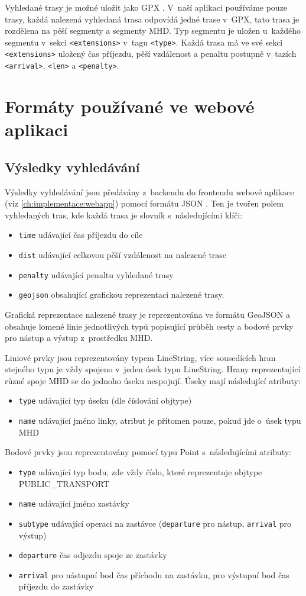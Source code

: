 Vyhledané trasy je možné uložit jako GPX \cite{GPX}. V~naší aplikaci používáme pouze trasy, každá
nalezená vyhledaná trasa odpovídá jedné trase v~GPX, tato trasa je rozdělena na
pěší segmenty a segmenty MHD. Typ segmentu je uložen u~každého segmentu v~sekci
{\tt <extensions>} v~tagu {\tt <type>}. Každá trasa má ve své sekci {\tt
<extensions>} uložený čas příjezdu, pěší vzdálenost a penaltu postupně v~tazích
{\tt <arrival>}, {\tt <len>} a {\tt <penalty>}.

\section{Formáty používané ve webové aplikaci}
\subsection{Výsledky vyhledávání}
Výsledky vyhledávání jsou předávány z~backendu do frontendu webové aplikace
(viz \ref{ch:implementace:webapp}) pomocí formátu JSON \cite{JSON}. Ten je tvořen polem vyhledaných
tras, kde každá trasa je slovník s~následujícími klíči:
\begin{itemize}
	\item {\tt time} udávající čas příjezdu do cíle
	\item {\tt dist} udávající celkovou pěší vzdálenost na nalezené trase
	\item {\tt penalty} udávající penaltu vyhledané trasy
	\item {\tt geojson} obsahující grafickou reprezentaci nalezené trasy. 
\end{itemize}
Grafická reprezentace nalezené trasy je reprezentována ve formátu
GeoJSON \cite{GeoJSON} a
obsahuje lomené linie jednotlivých typů popisující průběh cesty a bodové prvky
pro nástup a výstup z~prostředku MHD.

Liniové prvky jsou reprezentovány typem LineString, více sousedících hran
stejného typu je vždy spojeno v~jeden úsek typu LineString. Hrany reprezentující různé
spoje MHD se do jednoho úseku nespojují. Úseky mají následující atributy: 
\begin{itemize}
	\item {\tt type} udávající typ úseku (dle číslování objtype)
	\item {\tt name} udávající jméno linky, atribut je přítomen pouze, pokud
	jde o~úsek typu MHD
\end{itemize}
Bodové prvky jsou reprezentovány pomocí typu Point s~následujícími atributy: 
\begin{itemize}
	\item {\tt type} udávající typ bodu, zde vždy číslo, které reprezentuje objtype PUBLIC\_TRANSPORT  	
	\item {\tt name} udávající jméno zastávky
	\item {\tt subtype} udávající operaci na zastávce ({\tt departure} pro
	nástup, {\tt arrival} pro výstup)
	\item {\tt departure} čas odjezdu spoje ze zastávky
	\item {\tt arrival} pro nástupní bod čas příchodu na zastávku, pro
	výstupní bod čas příjezdu do zastávky
\end{itemize}
